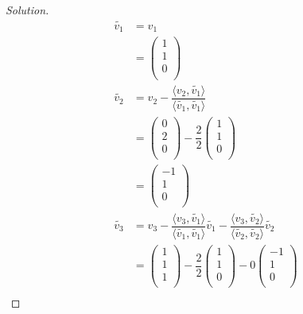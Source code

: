 \documentclass[fleqn, a4paper, 12pt]{article}
\theoremstyle{definition}
\theoremstyle{theorem}
\theoremstyle{remark}
\newenvironment{solution} %
	{\begin{proof}[Solution]\let\qed\relax}
	{\end{proof}}
\numberwithin{corollary}{theorem}
\numberwithin{equation}{theorem}
\begin{document}
\begin{solution}
	\begin{align*}
		\widetilde{v_1} &= v_1\\
		&= 
			\begin{pmatrix}
				1\\
				1\\
				0\\
			\end{pmatrix}\\
		\widetilde{v_2} &= v_2 - \dfrac{\langle v_2, \widetilde{v_1} \rangle}{\langle \widetilde{v_1}, \widetilde{v_1} \rangle}\\
		&= 
			\begin{pmatrix}
				0\\
				2\\
				0\\
			\end{pmatrix}
			- \dfrac{2}{2}
			\begin{pmatrix}
				1\\
				1\\
				0\\
			\end{pmatrix}\\
		&= 
			\begin{pmatrix}
				-1\\
				1\\
				0\\
			\end{pmatrix}\\
		\widetilde{v_3} &= v_3 - \dfrac{\langle v_3, \widetilde{v_1} \rangle}{\langle \widetilde{v_1}, \widetilde{v_1} \rangle} \widetilde{v_1} - \dfrac{\langle v_3, \widetilde{v_2} \rangle}{\langle \widetilde{v_2}, \widetilde{v_2} \rangle} \widetilde{v_2}\\
		&= 
			\begin{pmatrix}
				1\\
				1\\
				1\\
			\end{pmatrix}
			- \dfrac{2}{2} 
			\begin{pmatrix}
				1\\
				1\\
				0\\
			\end{pmatrix}
			- 0
			\begin{pmatrix}
				-1\\
				1\\
				0\\
			\end{pmatrix}\\

\end{align*}
\end{solution}
\end{document}
